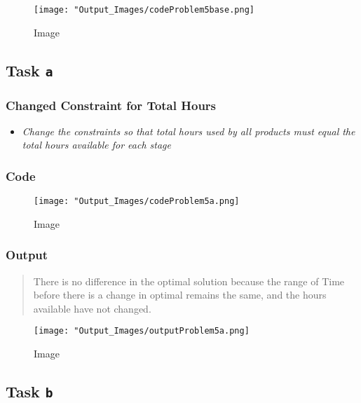 \documentclass[
  12pt,
]{article}
\providecommand{\tightlist}{%
  \setlength{\itemsep}{0pt}\setlength{\parskip}{0pt}}
\begin{document}
\begin{figure}
\centering
\texttt{[image: "Output\_Images/codeProblem5base.png]}
\caption{Image}
\end{figure}

\hypertarget{task-a-2}{%
\subsection{\texorpdfstring{Task \texttt{a}}{Task a}}\label{task-a-2}}

\hypertarget{changed-constraint-for-total-hours}{%
\subsubsection{Changed Constraint for Total
Hours}\label{changed-constraint-for-total-hours}}

\begin{itemize}
\tightlist
\item
  \emph{Change the constraints so that total hours used by all products
  must equal the total hours available for each stage}
\end{itemize}

\hypertarget{code-5}{%
\subsubsection{Code}\label{code-5}}

\begin{figure}
\centering
\texttt{[image: "Output\_Images/codeProblem5a.png]}
\caption{Image}
\end{figure}

\hypertarget{output-5}{%
\subsubsection{Output}\label{output-5}}

\begin{quote}
There is no difference in the optimal solution because the range of Time
before there is a change in optimal remains the same, and the hours
available have not changed.
\end{quote}

\begin{figure}
\centering
\texttt{[image: "Output\_Images/outputProblem5a.png]}
\caption{Image}
\end{figure}

\hypertarget{task-b-1}{%
\subsection{\texorpdfstring{Task \texttt{b}}{Task b}}\label{task-b-1}}
\end{document}
